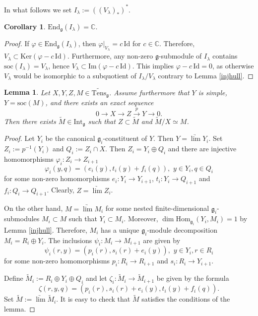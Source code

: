 \documentclass{birkmult}
\newcounter{theorem}
\newtheorem{lemma}[theo]{Lemma}
\newtheorem{corollary}[theo]{Corollary}
\newcommand {\CC} {\mathbb {C}}
\newcommand {\End} {\mathrm{End}}
\newcommand {\Ker} {\mathrm{Ker}}
\newcommand {\Id} {\mathrm{Id}}
\renewcommand{\gg}{\mathfrak{g}}
\renewcommand {\phi} {\varphi}
\renewcommand{\Im}{\mathrm{Im}}
\newcommand{\Int}{\mathrm{Int}}
\newcommand{\lind}{\widetilde{\mathrm{Tens}}}
\newcommand{\soc}{\mathrm{soc}}
\renewcommand{\hom}{\mathrm{Hom}}
\begin{document}
In what follows we set $I_\lambda:=((V_\lambda)_*)^*$.
\begin{corollary}\label{brick} $\End_\gg(I_\lambda)=\CC$.
\end{corollary}
\begin{proof} If $\phi\in \End_\gg(I_\lambda)$, then
$\phi|_{V_\lambda}=c\,\Id$ for $c\in\CC$. Therefore,
$V_\lambda\subset\Ker(\phi-c\,\Id)$. Furthermore, any non-zero
$\gg$-submodule of $I_\lambda$ contains $\soc(I_\lambda)=V_\lambda$, hence
$V_\lambda \subset\Im(\phi-c\,\Id)$. This implies $\phi-c\,\Id=0$,
as otherwise $V_{\lambda}$ would be isomorphic to a subquotient of $I_\lambda /
V_\lambda$ contrary to Lemma \ref{injhull}.
\end{proof}
\begin{lemma}\label{glue} Let $X,Y,Z,M\in\lind_\gg$. Assume furthermore that $Y$
is simple, $Y=\soc(M)$, and there exists an exact sequence $$0\to
X\to Z \stackrel{p}{\to} Y\to 0.$$ Then there exists $\tilde
{M}\in\Int_\gg$ such that $Z\subset \tilde{M}$  and
  $\tilde{M}/X\simeq M$.
\end{lemma}
\begin{proof} Let $Y_i$ be the canonical $\gg_i$-constituent of
  $Y$. Then $Y=\underrightarrow{\lim}Y_i$. Set $Z_i:=p^{-1}(Y_i)$ and
  $Q_i:=Z_i\cap X$. Then
$Z_i=Y_i\oplus Q_i$ and there are injective homomorphisms
$\phi_i:Z_i\to Z_{i+1}$
$$\phi_i(y,q)=(e_i(y),t_i(y)+f_i(q)),\,\,y\in Y_i, q\in Q_i$$
for some non-zero homomorphisms $e_i:Y_i\to Y_{i+1}$, $t_i:Y_i\to
Q_{i+1}$ and $f_i:Q_i\to Q_{i+1}$. Clearly,
$Z=\underrightarrow{\lim}Z_i$.

On the other hand, $M=\underrightarrow{\lim}M_i$ for some nested
finite-dimensional $\gg_i$-submodules $M_i\subset M$ such that
$Y_i\subset M_i$. Moreover, $\dim\hom_{{\gg}_i} (Y_i,M_i)=1$ by Lemma
\ref{injhull}. Therefore, $M_i$ has a unique $\gg_i$-module decomposition
$M_i=R_i\oplus Y_i$. The inclusions $\psi_i:M_i\to M_{i+1}$  are
given by
$$\psi_i(r,y)=(p_i(r),s_i(r)+e_i(y)),\,\,y\in Y_i, r\in R_i$$
for some non-zero homomorphisms $p_i:R_i\to R_{i+1}$ and
$s_i:R_i\to Y_{i+1}$.

Define $\tilde{M}_i:=R_i\oplus Y_i\oplus Q_i$ and let
$\zeta_i:\tilde{M}_i\to \tilde{M}_{i+1}$ be given by the formula
$$\zeta(r,y,q)=(p_i(r),s_i(r)+e_i(y),t_i(y)+f_i(q)).$$
Set $\tilde{M}:=\underrightarrow{\lim}\tilde{M}_i$. It is easy to
check that $\tilde{M}$ satisfies the conditions of the lemma.
\end{proof}
\end{document}
